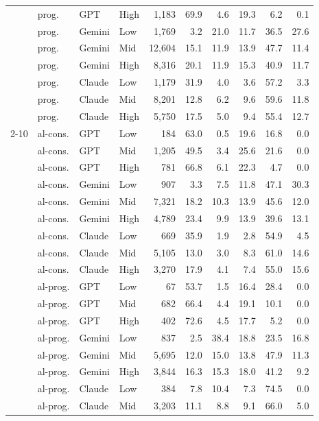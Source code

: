 \begin{table}[t]
\begin{tabular}{llllrrrrrr}
 & prog. & GPT & High & 1{,}183 & 69.9 & 4.6 & 19.3 & 6.2 & 0.1 \\
 & prog. & Gemini & Low & 1{,}769 & 3.2 & 21.0 & 11.7 & 36.5 & 27.6 \\
 & prog. & Gemini & Mid & 12{,}604 & 15.1 & 11.9 & 13.9 & 47.7 & 11.4 \\
 & prog. & Gemini & High & 8{,}316 & 20.1 & 11.9 & 15.3 & 40.9 & 11.7 \\
 & prog. & Claude & Low & 1{,}179 & 31.9 & 4.0 & 3.6 & 57.2 & 3.3 \\
 & prog. & Claude & Mid & 8{,}201 & 12.8 & 6.2 & 9.6 & 59.6 & 11.8 \\
 & prog. & Claude & High & 5{,}750 & 17.5 & 5.0 & 9.4 & 55.4 & 12.7 \\
\cmidrule(lr){2-10}
 & al-cons. & GPT & Low & 184 & 63.0 & 0.5 & 19.6 & 16.8 & 0.0 \\
 & al-cons. & GPT & Mid & 1{,}205 & 49.5 & 3.4 & 25.6 & 21.6 & 0.0 \\
 & al-cons. & GPT & High & 781 & 66.8 & 6.1 & 22.3 & 4.7 & 0.0 \\
 & al-cons. & Gemini & Low & 907 & 3.3 & 7.5 & 11.8 & 47.1 & 30.3 \\
 & al-cons. & Gemini & Mid & 7{,}321 & 18.2 & 10.3 & 13.9 & 45.6 & 12.0 \\
 & al-cons. & Gemini & High & 4{,}789 & 23.4 & 9.9 & 13.9 & 39.6 & 13.1 \\
 & al-cons. & Claude & Low & 669 & 35.9 & 1.9 & 2.8 & 54.9 & 4.5 \\
 & al-cons. & Claude & Mid & 5{,}105 & 13.0 & 3.0 & 8.3 & 61.0 & 14.6 \\
 & al-cons. & Claude & High & 3{,}270 & 17.9 & 4.1 & 7.4 & 55.0 & 15.6 \\
 & al-prog. & GPT & Low & 67 & 53.7 & 1.5 & 16.4 & 28.4 & 0.0 \\
 & al-prog. & GPT & Mid & 682 & 66.4 & 4.4 & 19.1 & 10.1 & 0.0 \\
 & al-prog. & GPT & High & 402 & 72.6 & 4.5 & 17.7 & 5.2 & 0.0 \\
 & al-prog. & Gemini & Low & 837 & 2.5 & 38.4 & 18.8 & 23.5 & 16.8 \\
 & al-prog. & Gemini & Mid & 5{,}695 & 12.0 & 15.0 & 13.8 & 47.9 & 11.3 \\
 & al-prog. & Gemini & High & 3{,}844 & 16.3 & 15.3 & 18.0 & 41.2 & 9.2 \\
 & al-prog. & Claude & Low & 384 & 7.8 & 10.4 & 7.3 & 74.5 & 0.0 \\
 & al-prog. & Claude & Mid & 3{,}203 & 11.1 & 8.8 & 9.1 & 66.0 & 5.0 \\

\end{tabular}
\end{table}

